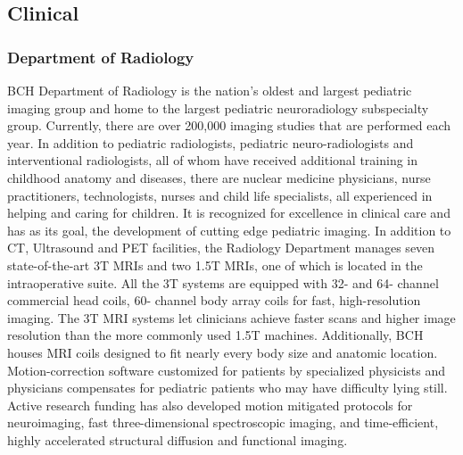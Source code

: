\documentclass[11pt]{amsart}
\begin{document}
\hypertarget{x-clinical}{\subsection*{Clinical}}
\hypertarget{x-department-of-radiology}{\subsubsection*{Department of Radiology}}
BCH Department of Radiology is the nation’s oldest and largest pediatric imaging group and home to the largest pediatric neuroradiology subspecialty group. Currently, there are over 200,000 imaging studies that are performed each year. In addition to pediatric radiologists, pediatric neuro-radiologists and interventional radiologists, all of whom have received additional training in childhood anatomy and diseases, there are nuclear medicine physicians, nurse practitioners, technologists, nurses and child life specialists, all experienced in helping and caring for children. It is recognized for excellence in clinical care and has as its goal, the development of cutting edge pediatric imaging. In addition to CT, Ultrasound and PET facilities, the Radiology Department manages seven state-of-the-art 3T MRIs and two 1.5T MRIs, one of which is located in the intraoperative suite. All the 3T systems are equipped with 32- and 64- channel commercial head coils, 60- channel body array coils for fast, high-resolution imaging. The 3T MRI systems let clinicians achieve faster scans and higher image resolution than the more commonly used 1.5T machines. Additionally, BCH houses MRI coils designed to fit nearly every body size and anatomic location. Motion-correction software customized for patients by specialized physicists and physicians compensates for pediatric patients who may have difficulty lying still. Active research funding has also developed motion mitigated protocols for neuroimaging, fast three-dimensional spectroscopic imaging, and time-efficient, highly accelerated structural diffusion and functional imaging.
\end{document}
